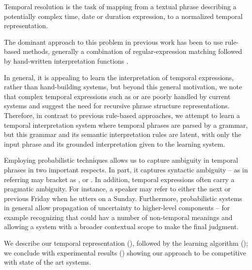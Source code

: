 
Temporal resolution is the task of mapping from a textual phrase describing
	a potentially complex time, date or duration expression, to a normalized 
	temporal representation.

The dominant approach to this problem in previous work has been to use
	rule-based methods, generally a combination of regular-expression matching
	followed by hand-written interpretation functions
	\cite{key:2000mani-temporal,key:2003saquete-temporal,key:2004puscasu-temporal,key:2010grover-temporal,key:2010uzzaman-temporal,key:2010kolomiyets-temporal,key:2010strotgen-temporal}.

In general, it is appealing to learn the interpretation of temporal expressions,
	rather than hand-building systems, but beyond this general motivation,
	we note that complex temporal expressions such as 
	or  are poorly handled by current
	systems and suggest the need for recursive phrase structure representations.
Therefore, in contrast to previous rule-based approaches, we attempt to learn
	a temporal interpretation system where temporal phrases are parsed by
	a grammar, but this grammar and its semantic interpretation rules are
	latent, with only the input phrase and its grounded interpretation given
	to the learning system.

Employing probabilistic techniques allows us to capture ambiguity in temporal 
	phrases in two important respects.
In part, it captures syntactic ambiguity -- as in  referring may bracket as , or
	.
In addition, temporal expressions often carry a pragmatic ambiguity.
For instance, a speaker may refer to either the next or previous Friday
	when he utters  on a Sunday.
Furthermore, probabilistic systems in general allow propagation of uncertainty
	to higher-level components -- for example recognizing that  could
	hav a number of non-temporal meanings and allowing a system with a broader
	contextual scope to make the final judgment.

We describe our temporal representation
	(), followed by the learning algorithm
	(); we conclude with experimental results 
	() showing our
	approach to be competitive with state of the art systems.


